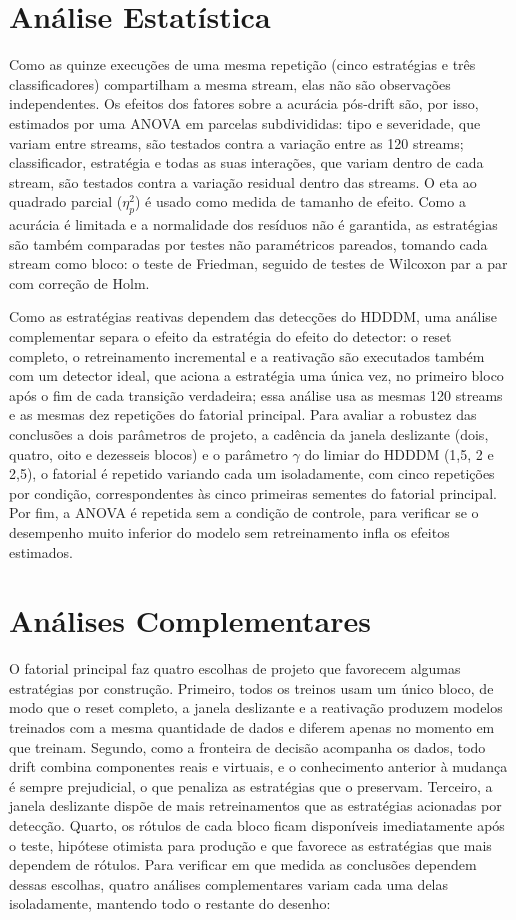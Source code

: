 \section{Análise Estatística}
\label{sec:analise_estatistica}
Como as quinze execuções de uma mesma repetição (cinco estratégias e três
classificadores) compartilham a mesma stream, elas não são observações
independentes. Os efeitos dos fatores sobre a acurácia pós-drift são, por
isso, estimados por uma ANOVA em parcelas subdivididas: tipo e severidade,
que variam entre streams, são testados contra a variação entre as 120
streams; classificador, estratégia e todas as suas interações, que variam
dentro de cada stream, são testados contra a variação residual dentro das
streams. O eta ao quadrado parcial ($\eta^2_p$) é usado como medida de
tamanho de efeito. Como a acurácia é limitada e a normalidade dos resíduos
não é garantida, as estratégias são também comparadas por testes não
paramétricos pareados, tomando cada stream como bloco: o teste de Friedman,
seguido de testes de Wilcoxon par a par com correção de Holm.

Como as estratégias reativas dependem das detecções do HDDDM, uma análise
complementar separa o efeito da estratégia do efeito do detector: o reset
completo, o retreinamento incremental e a reativação são executados também
com um detector ideal, que aciona a estratégia uma única vez, no primeiro
bloco após o fim de cada transição verdadeira; essa análise usa as mesmas
120 streams e as mesmas dez repetições do fatorial principal. Para avaliar a
robustez das conclusões a dois parâmetros de projeto, a cadência da janela
deslizante (dois, quatro, oito e dezesseis blocos) e o parâmetro $\gamma$ do
limiar do HDDDM (1,5, 2 e 2,5), o fatorial é repetido variando cada um
isoladamente, com cinco repetições por condição, correspondentes às cinco
primeiras sementes do fatorial principal. Por fim, a ANOVA é repetida sem a
condição de controle, para verificar se o desempenho muito inferior do
modelo sem retreinamento infla os efeitos estimados.

\section{Análises Complementares}
\label{sec:complementares}
O fatorial principal faz quatro escolhas de projeto que favorecem algumas
estratégias por construção. Primeiro, todos os treinos usam um único bloco,
de modo que o reset completo, a janela deslizante e a reativação produzem
modelos treinados com a mesma quantidade de dados e diferem apenas no
momento em que treinam. Segundo, como a fronteira de decisão acompanha os
dados, todo drift combina componentes reais e virtuais, e o conhecimento
anterior à mudança é sempre prejudicial, o que penaliza as estratégias que
o preservam. Terceiro, a janela deslizante dispõe de mais retreinamentos que
as estratégias acionadas por detecção. Quarto, os rótulos de cada bloco ficam
disponíveis imediatamente após o teste, hipótese otimista para produção e
que favorece as estratégias que mais dependem de rótulos. Para verificar em
que medida as conclusões dependem dessas escolhas, quatro análises
complementares variam cada uma delas isoladamente, mantendo todo o restante
do desenho:

